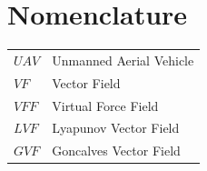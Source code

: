 \documentclass[conf]{new-aiaa}
\begin{document}
%
%
%
%




\section{Nomenclature}

{\renewcommand\arraystretch{1.0}
\noindent\begin{longtable*}{@{}l @{\quad=\quad} l@{}}
$UAV$  & Unmanned Aerial Vehicle \\
$VF$   & Vector Field \\
$VFF$  & Virtual Force Field \\
$LVF$  & Lyapunov Vector Field \\
$GVF$  & Goncalves Vector Field \\
\end{longtable*}}
\end{document}
